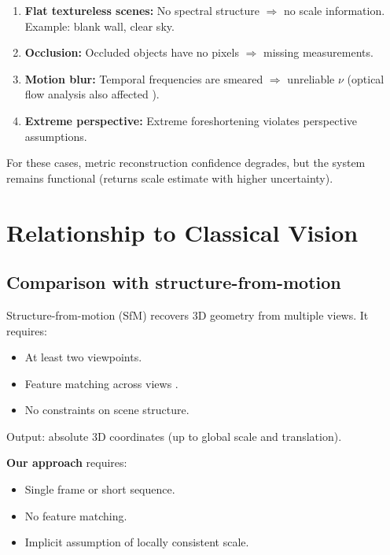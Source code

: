 \documentclass[11pt,twocolumn,a4paper]{article}
\theoremstyle{definition}
\begin{document}
\begin{enumerate}[leftmargin=1.4em]
  \item \textbf{Flat textureless scenes:} No spectral structure $\Rightarrow$ no scale information. Example: blank wall, clear sky.
  \item \textbf{Occlusion:} Occluded objects have no pixels $\Rightarrow$ missing measurements.
  \item \textbf{Motion blur:} Temporal frequencies are smeared $\Rightarrow$ unreliable $\nu$ (optical flow analysis also affected \citep{horn1981}).
  \item \textbf{Extreme perspective:} Extreme foreshortening violates perspective assumptions.
\end{enumerate}

For these cases, metric reconstruction confidence degrades, but the system remains functional (returns scale estimate with higher uncertainty).

\section{Relationship to Classical Vision}

\subsection{Comparison with structure-from-motion}

Structure-from-motion (SfM) \citep{seitz2006,hartley2003} recovers 3D geometry from multiple views. It requires:
\begin{itemize}
  \item At least two viewpoints.
  \item Feature matching across views \citep{lowe2004}.
  \item No constraints on scene structure.
\end{itemize}

Output: absolute 3D coordinates (up to global scale and translation).

\textbf{Our approach} requires:
\begin{itemize}
  \item Single frame or short sequence.
  \item No feature matching.
  \item Implicit assumption of locally consistent scale.
\end{itemize}
\end{document}
